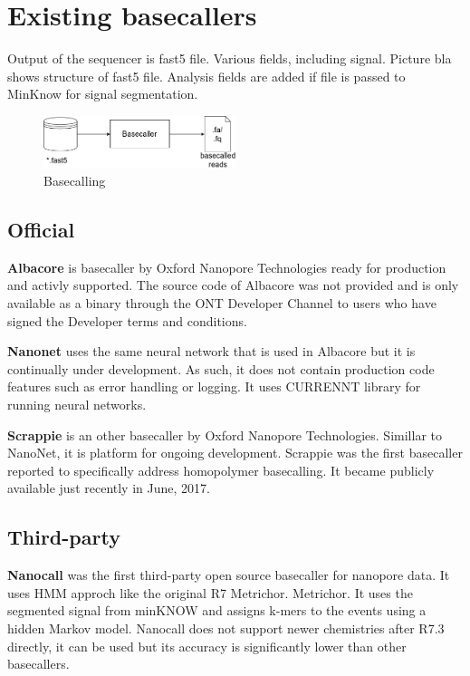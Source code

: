 \documentclass[times, utf8, diplomski, numeric, english]{fer}
\begin{document}
\section{Existing basecallers}

Output of the sequencer is fast5 file. Various fields, including signal.
Picture bla shows structure of fast5 file. Analysis fields are added if file is passed to MinKnow for signal segmentation.

\begin{figure}[!ht]
	\begin{center}
		\includegraphics[width=0.5\textwidth]{./imgs/basecalling.png}
		\caption{Basecalling}
		\label{fg:basecalling}
	\end{center}
\end{figure}

\subsection{Official}
\textbf{Albacore} is basecaller by Oxford Nanopore Technologies ready for production and activly supported.
The source code of Albacore was not provided and is only available as a binary through the ONT Developer Channel to users who have signed the Developer terms and conditions. 

\textbf{Nanonet} uses the same neural network that is used in Albacore but it is continually under development. As such, it does not contain production code features such as error handling or logging. It uses CURRENNT library for running neural networks.


\textbf{Scrappie} is an other basecaller by Oxford Nanopore Technologies. Simillar to NanoNet, it is platform for ongoing development. Scrappie was the first basecaller reported to specifically address homopolymer basecalling. It became publicly available just recently in June, 2017.

\subsection{Third-party}

\textbf{Nanocall}\cite{David046086} was the first third-party open source basecaller for nanopore data. It uses HMM approch like the original R7 Metrichor. Metrichor. It uses the segmented signal from minKNOW and assigns k-mers to the events using a hidden Markov model. 
Nanocall does not support newer chemistries after R7.3 directly, it can be used but its accuracy is significantly lower than other basecallers.
 
\end{document}
